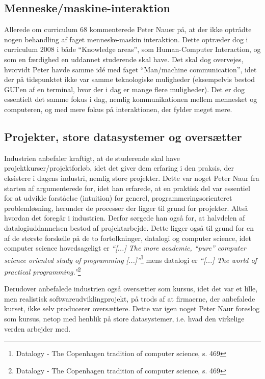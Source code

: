 \documentclass[10pt,a4paper]{article}
\newcommand{\citat}[2]{\vspace{0.1cm}\newline\textit{``#1''}\hspace{0.1cm}\footnote{#2}\vspace{0.1cm}\newline}
\begin{document}
\subsection{Menneske/maskine-interaktion}
Allerede om curriculum 68 kommenterede Peter Nauer på, at der ikke optrådte
nogen behandling af faget menneske-maskin interaktion. Dette optræder dog i
curriculum 2008 i både ``Knowledge areas'', som Human-Computer Interaction, og
som en færdighed en uddannet studerende skal have. Det skal dog overvejes,
hvorvidt Peter havde samme idé med faget ``Man/machine communication'', idet der
på tidspunktet ikke var samme teknologiske muligheder (eksempelvis bestod GUI'en
af en terminal, hvor der i dag er mange flere muligheder). Det er dog essentielt
det samme fokus i dag, nemlig kommunikationen mellem mennesket og computeren, og
med mere fokus på interaktionen, der fylder meget mere.

\subsection{Projekter, store datasystemer og oversætter}
Industrien anbefaler kraftigt, at de studerende skal have
projektkurser/projektforløb, idet det giver dem erfaring i den praksis, der
eksistere i dagens industri, nemlig store projekter. Dette var noget Peter Naur
fra starten af argumenterede for, idet han erfarede, at en praktisk del var
essentiel for at udvikle forståelse (intuition) for generel,
programmeringsorienteret problemløsning, herunder de processer der ligger til
grund for projekter. Altså hvordan det foregår i industrien. Derfor sørgede han
også for, at halvdelen af datalogiuddannelsen bestod af projektarbejde. Dette
ligger også til grund for en af de største forskelle på de to fortolkninger,
datalogi og computer science, idet computer science hovedsageligt er
\citat{[...] The more academic, ``pure'' computer science oriented study of
    programming [...]}{Datalogy - The Copenhagen tradition of computer science,
    s. 469} mens datalogi er \citat{[...] The world of practical
    programming.}{Datalogy - The Copenhagen tradition of computer science, s.
    469}

Derudover anbefalede industrien også oversætter som kursus, idet det var et
lille, men realistisk softwareudviklingprojekt, på trods af at firmaerne, der
anbefalede kurset, ikke selv producerer oversættere. Dette var igen noget Peter
Naur foreslog som kursus, netop med henblik på store datasystemer, i.e. hvad den
virkelige verden arbejder med.
\end{document}
